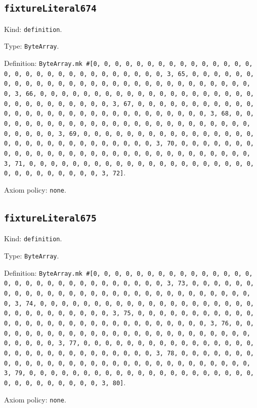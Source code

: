 \documentclass[11pt]{article}
\begin{document}
\subsection*{\texttt{fixtureLiteral674}}
\noindent Kind: \texttt{definition}.\par
\noindent Type: \texttt{ByteArray}.\par
\noindent Definition: \texttt{ByteArray.mk \#[0, 0, 0, 0, 0, 0, 0, 0, 0, 0, 0, 0, 0, 0, 0, 0, 0, 0, 0, 0, 0, 0, 0, 0, 0, 0, 0, 0, 0, 0, 3, 65, 0, 0, 0, 0, 0, 0, 0, 0, 0, 0, 0, 0, 0, 0, 0, 0, 0, 0, 0, 0, 0, 0, 0, 0, 0, 0, 0, 0, 0, 0, 3, 66, 0, 0, 0, 0, 0, 0, 0, 0, 0, 0, 0, 0, 0, 0, 0, 0, 0, 0, 0, 0, 0, 0, 0, 0, 0, 0, 0, 0, 0, 0, 3, 67, 0, 0, 0, 0, 0, 0, 0, 0, 0, 0, 0, 0, 0, 0, 0, 0, 0, 0, 0, 0, 0, 0, 0, 0, 0, 0, 0, 0, 0, 0, 3, 68, 0, 0, 0, 0, 0, 0, 0, 0, 0, 0, 0, 0, 0, 0, 0, 0, 0, 0, 0, 0, 0, 0, 0, 0, 0, 0, 0, 0, 0, 0, 3, 69, 0, 0, 0, 0, 0, 0, 0, 0, 0, 0, 0, 0, 0, 0, 0, 0, 0, 0, 0, 0, 0, 0, 0, 0, 0, 0, 0, 0, 0, 0, 3, 70, 0, 0, 0, 0, 0, 0, 0, 0, 0, 0, 0, 0, 0, 0, 0, 0, 0, 0, 0, 0, 0, 0, 0, 0, 0, 0, 0, 0, 0, 0, 3, 71, 0, 0, 0, 0, 0, 0, 0, 0, 0, 0, 0, 0, 0, 0, 0, 0, 0, 0, 0, 0, 0, 0, 0, 0, 0, 0, 0, 0, 0, 0, 3, 72]}.\par
\noindent Axiom policy: \texttt{none}.\par
\subsection*{\texttt{fixtureLiteral675}}
\noindent Kind: \texttt{definition}.\par
\noindent Type: \texttt{ByteArray}.\par
\noindent Definition: \texttt{ByteArray.mk \#[0, 0, 0, 0, 0, 0, 0, 0, 0, 0, 0, 0, 0, 0, 0, 0, 0, 0, 0, 0, 0, 0, 0, 0, 0, 0, 0, 0, 0, 0, 3, 73, 0, 0, 0, 0, 0, 0, 0, 0, 0, 0, 0, 0, 0, 0, 0, 0, 0, 0, 0, 0, 0, 0, 0, 0, 0, 0, 0, 0, 0, 0, 3, 74, 0, 0, 0, 0, 0, 0, 0, 0, 0, 0, 0, 0, 0, 0, 0, 0, 0, 0, 0, 0, 0, 0, 0, 0, 0, 0, 0, 0, 0, 0, 3, 75, 0, 0, 0, 0, 0, 0, 0, 0, 0, 0, 0, 0, 0, 0, 0, 0, 0, 0, 0, 0, 0, 0, 0, 0, 0, 0, 0, 0, 0, 0, 3, 76, 0, 0, 0, 0, 0, 0, 0, 0, 0, 0, 0, 0, 0, 0, 0, 0, 0, 0, 0, 0, 0, 0, 0, 0, 0, 0, 0, 0, 0, 0, 3, 77, 0, 0, 0, 0, 0, 0, 0, 0, 0, 0, 0, 0, 0, 0, 0, 0, 0, 0, 0, 0, 0, 0, 0, 0, 0, 0, 0, 0, 0, 0, 3, 78, 0, 0, 0, 0, 0, 0, 0, 0, 0, 0, 0, 0, 0, 0, 0, 0, 0, 0, 0, 0, 0, 0, 0, 0, 0, 0, 0, 0, 0, 0, 3, 79, 0, 0, 0, 0, 0, 0, 0, 0, 0, 0, 0, 0, 0, 0, 0, 0, 0, 0, 0, 0, 0, 0, 0, 0, 0, 0, 0, 0, 0, 0, 3, 80]}.\par
\noindent Axiom policy: \texttt{none}.\par
\end{document}
